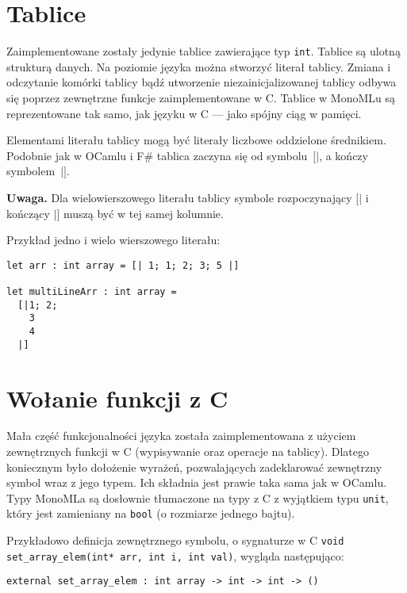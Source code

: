 \documentclass[declaration,shortabstract]{iithesis}
\begin{document}

\section{Tablice}

Zaimplementowane zostały jedynie tablice zawierające typ \texttt{int}. 
Tablice są ulotną strukturą danych. Na poziomie języka można
 stworzyć literał 
tablicy. Zmiana i odczytanie komórki tablicy bądź utworzenie niezainicjalizowanej 
tablicy odbywa się poprzez zewnętrzne funkcje zaimplementowane w C. 
Tablice w MonoMLu są reprezentowane tak samo, jak języku w C --- jako spójny
ciąg w pamięci.

Elementami literału tablicy mogą być literały liczbowe oddzielone średnikiem. 
Podobnie jak w OCamlu i F\# tablica zaczyna się od symbolu~$[|$, a 
kończy symbolem~$|]$.

\textbf{Uwaga.} Dla wielowierszowego literału tablicy symbole rozpoczynający 
$[|$ i kończący $|]$ muszą być w tej samej kolumnie.

\pagebreak
Przykład jedno i wielo wierszowego literału:
\begin{lstlisting}[frame=lines]
let arr : int array = [| 1; 1; 2; 3; 5 |]

let multiLineArr : int array = 
  [|1; 2;
    3
    4
  |]
\end{lstlisting}

\section{Wołanie funkcji z C}

Mała część funkcjonalności języka została zaimplementowana z użyciem 
zewnętrznych funkcji w C (wypisywanie oraz operacje na tablicy). Dlatego 
koniecznym było dołożenie wyrażeń, pozwalających zadeklarować zewnętrzny symbol 
wraz z jego typem. Ich składnia jest prawie taka sama jak w OCamlu.
Typy MonoMLa są dosłownie tłumaczone na typy z C z wyjątkiem typu \texttt{unit}, 
który jest zamieniany na \texttt{bool} (o rozmiarze jednego bajtu).

Przykładowo definicja zewnętrznego symbolu, o sygnaturze w C \newline 
\texttt{void set\_array\_elem(int* arr, int i, int val)}, wygląda następująco: 

\begin{lstlisting}[frame=lines]
external set_array_elem : int array -> int -> int -> () 
\end{lstlisting}
\end{document}
